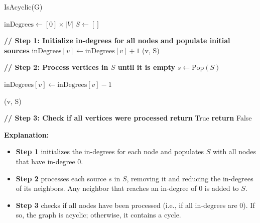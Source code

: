 \documentclass{article}
\begin{document}
\begin{algorithm}
\caption{IsAcyclic(G)}
\begin{algorithmic}[1]
    \State \( \text{inDegrees} \gets [0] \times |V| \) 
    \State \( S \gets [] \) 

    \State \textbf{// Step 1: Initialize in-degrees for all nodes and populate initial sources}
        \State \( \text{inDegrees}[v] \gets \text{inDegrees}[v] + 1 \) 
    \EndFor
            \State {}(v, S) 
        \EndIf
    \EndFor

    \State \textbf{// Step 2: Process vertices in \( S \) until it is empty}
        \State \( s \gets \text{Pop}(S) \) 

            \State \( \text{inDegrees}[v] \gets \text{inDegrees}[v] - 1 \) 

                \State {}(v, S) 
            \EndIf
        \EndFor
    \EndWhile

    \State \textbf{// Step 3: Check if all vertices were processed}
        \State \textbf{return} True 
    \Else
        \State \textbf{return} False 
    \EndIf
\end{algorithmic}
\end{algorithm}

\textbf{Explanation:}
\begin{itemize}
    \item \textbf{Step 1} initializes the in-degrees for each node and populates \( S \) with all nodes that have in-degree 0.
    \item \textbf{Step 2} processes each source \( s \) in \( S \), removing it and reducing the in-degrees of its neighbors. Any neighbor that reaches an in-degree of 0 is added to \( S \).
    \item \textbf{Step 3} checks if all nodes have been processed (i.e., if all in-degrees are 0). If so, the graph is acyclic; otherwise, it contains a cycle.
\end{itemize}
\end{document}

